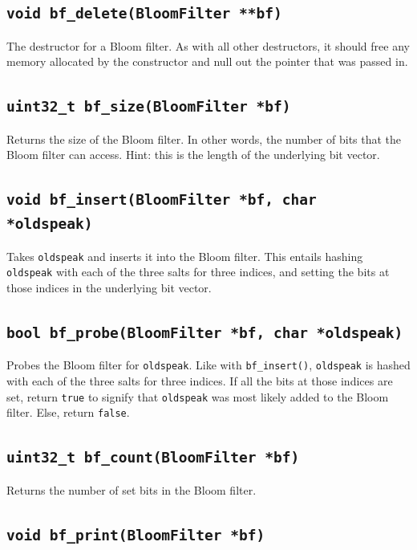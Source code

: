 \documentclass{article}
\begin{document}
\subsection{\texttt{void bf\_delete(BloomFilter **bf)}}

The destructor for a Bloom filter. As with all other destructors, it
should free any memory allocated by the constructor and null out the
pointer that was passed in.

\subsection{\texttt{uint32\_t bf\_size(BloomFilter *bf)}}

Returns the size of the Bloom filter. In other words, the number of bits
that the Bloom filter can access. Hint: this is the length of the
underlying bit vector.

\subsection{\texttt{void bf\_insert(BloomFilter *bf, char *oldspeak)}}

Takes \texttt{oldspeak} and inserts it into the Bloom filter. This
entails hashing \texttt{oldspeak} with each of the three salts for three
indices, and setting the bits at those indices in the underlying bit
vector.

\subsection{\texttt{bool bf\_probe(BloomFilter *bf, char *oldspeak)}}

Probes the Bloom filter for \texttt{oldspeak}. Like with
\texttt{bf\_insert()}, \texttt{oldspeak} is hashed with each of the
three salts for three indices. If all the bits at those indices are set,
return \texttt{true} to signify that \texttt{oldspeak} was most likely
added to the Bloom filter. Else, return \texttt{false}.

\subsection{\texttt{uint32\_t bf\_count(BloomFilter *bf)}}

Returns the number of set bits in the Bloom filter.

\subsection{\texttt{void bf\_print(BloomFilter *bf)}}
\end{document}

